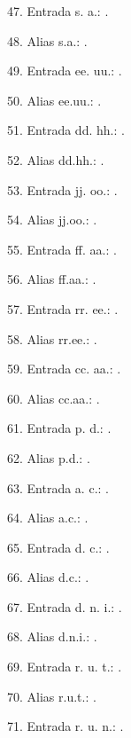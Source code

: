 \documentclass{article}
\begin{document}
47. Entrada s. a.: .

48. Alias s.a.: .

49. Entrada ee. uu.: .

50. Alias ee.uu.: .

51. Entrada dd. hh.: .

52. Alias dd.hh.: .

53. Entrada jj. oo.: .

54. Alias jj.oo.: .

55. Entrada ff. aa.: .

56. Alias ff.aa.: .

57. Entrada rr. ee.: .

58. Alias rr.ee.: .

59. Entrada cc. aa.: .

60. Alias cc.aa.: .

61. Entrada p. d.: .

62. Alias p.d.: .

63. Entrada a. c.: .

64. Alias a.c.: .

65. Entrada d. c.: .

66. Alias d.c.: .

67. Entrada d. n. i.: .

68. Alias d.n.i.: .

69. Entrada r. u. t.: .

70. Alias r.u.t.: .

71. Entrada r. u. n.: .
\end{document}
